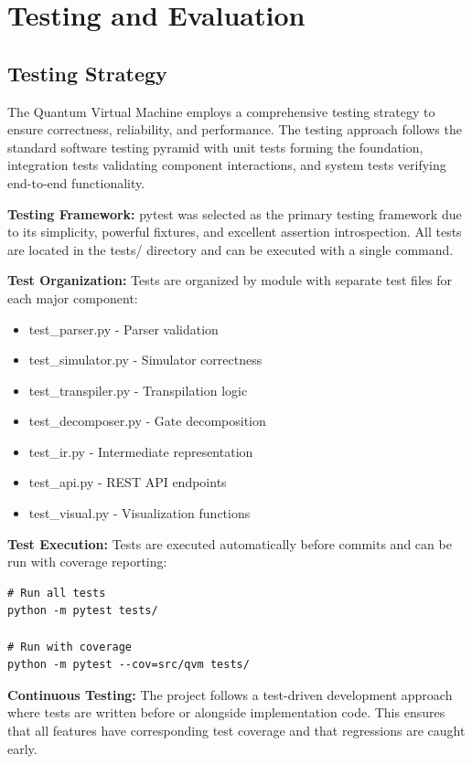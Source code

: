 \chapter{Testing and Evaluation}

\section{Testing Strategy}
The Quantum Virtual Machine employs a comprehensive testing strategy to ensure correctness, reliability, and performance. The testing approach follows the standard software testing pyramid with unit tests forming the foundation, integration tests validating component interactions, and system tests verifying end-to-end functionality.

\textbf{Testing Framework:} pytest was selected as the primary testing framework due to its simplicity, powerful fixtures, and excellent assertion introspection. All tests are located in the tests/ directory and can be executed with a single command.

\textbf{Test Organization:} Tests are organized by module with separate test files for each major component:
\begin{itemize}
\item test\_parser.py - Parser validation
\item test\_simulator.py - Simulator correctness
\item test\_transpiler.py - Transpilation logic
\item test\_decomposer.py - Gate decomposition
\item test\_ir.py - Intermediate representation
\item test\_api.py - REST API endpoints
\item test\_visual.py - Visualization functions
\end{itemize}

\textbf{Test Execution:} Tests are executed automatically before commits and can be run with coverage reporting:
\begin{verbatim}
# Run all tests
python -m pytest tests/

# Run with coverage
python -m pytest --cov=src/qvm tests/
\end{verbatim}

\textbf{Continuous Testing:} The project follows a test-driven development approach where tests are written before or alongside implementation code. This ensures that all features have corresponding test coverage and that regressions are caught early.

